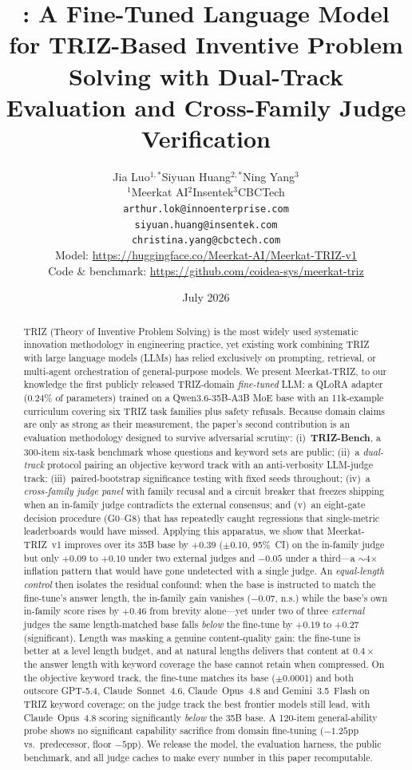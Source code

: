 \documentclass[11pt]{article}
\title{\model: A Fine-Tuned Language Model for TRIZ-Based Inventive
Problem Solving with Dual-Track Evaluation and Cross-Family
Judge Verification}
\author{%
  Jia Luo$^{1,*}$\quad Siyuan Huang$^{2,*}$\quad Ning Yang$^{3}$\\[2pt]
  $^{1}$Meerkat AI\quad $^{2}$Insentek\quad $^{3}$CBCTech\\[2pt]
  \texttt{arthur.lok@innoenterprise.com}\\
  \texttt{siyuan.huang@insentek.com}\\
  \texttt{christina.yang@cbctech.com}\\[2pt]
  \small Model: \url{https://huggingface.co/Meerkat-AI/Meerkat-TRIZ-v1}\\
  \small Code \& benchmark: \url{https://github.com/coidea-sys/meerkat-triz}
}
\date{July 2026}
\newcommand{\model}{Meerkat-TRIZ}
\begin{document}
\maketitle

\begin{abstract}
TRIZ (Theory of Inventive Problem Solving) is the most widely used
systematic innovation methodology in engineering practice, yet existing
work combining TRIZ with large language models (LLMs) has relied
exclusively on prompting, retrieval, or multi-agent orchestration of
general-purpose models. We present \model, to our knowledge the first
publicly released TRIZ-domain \emph{fine-tuned} LLM: a QLoRA adapter
(0.24\% of parameters) trained on a Qwen3.6-35B-A3B MoE base with an
11k-example curriculum covering six TRIZ task families plus safety
refusals. Because domain claims are only as strong as their measurement,
the paper's second contribution is an evaluation methodology designed to
survive adversarial scrutiny: (i)~\textbf{TRIZ-Bench}, a 300-item
six-task benchmark whose questions and keyword sets are public;
(ii)~a \emph{dual-track} protocol pairing an objective keyword track
with an anti-verbosity LLM-judge track; (iii)~paired-bootstrap
significance testing with fixed seeds throughout; (iv)~a
\emph{cross-family judge panel} with family recusal and a circuit
breaker that freezes shipping when an in-family judge contradicts the
external consensus; and (v)~an eight-gate decision procedure
(G0--G8) that has repeatedly caught regressions that single-metric
leaderboards would have missed. Applying this apparatus, we show that
\model~v1 improves over its 35B base by $+0.39$ ($\pm$0.10, 95\%~CI)
on the in-family judge but only $+0.09$ to $+0.10$ under two external
judges and $-0.05$ under a third---a $\sim$4$\times$ inflation pattern
that would have gone undetected with a single judge. An
\emph{equal-length control} then isolates the residual confound: when
the base is instructed to match the fine-tune's answer length, the
in-family gain vanishes ($-0.07$, n.s.) while the base's own in-family
score rises by $+0.46$ from brevity alone---yet under two of three
\emph{external} judges the same length-matched base falls
\emph{below} the fine-tune by $+0.19$ to $+0.27$ (significant).
Length was masking a genuine content-quality gain: the fine-tune is
better at a level length budget, and at natural lengths delivers that
content at $0.4\times$ the answer length with keyword coverage the
base cannot retain when compressed. On the objective
keyword track, the fine-tune matches its base ($\pm$0.0001) and both
outscore GPT-5.4, Claude~Sonnet~4.6, Claude~Opus~4.8 and
Gemini~3.5~Flash on TRIZ keyword coverage; on the judge track the best
frontier models still lead, with Claude~Opus~4.8 scoring significantly
\emph{below} the 35B base. A 120-item general-ability probe shows no
significant capability sacrifice from domain fine-tuning
($-1.25$pp vs.\ predecessor, floor $-5$pp). We release the model, the
evaluation harness, the public benchmark, and all judge caches to make
every number in this paper recomputable.
\end{abstract}
\end{document}

